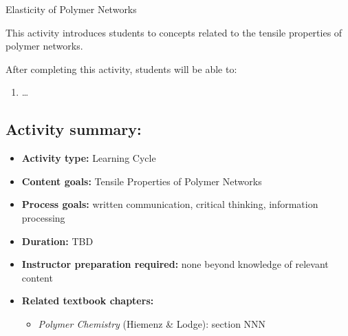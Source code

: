 %
%
%
%

\renewcommand{\figpath}{content/polymphys/mechanical-properties/elasticity/figs}
\renewcommand{\labelbase}{elasticity}

\begin{activity}{Elasticity of Polymer Networks}

\begin{instructornotes}
	This activity introduces students to concepts related to the tensile properties of polymer networks.
	
	After completing this activity, students will be able to:
	\begin{enumerate}
		\item \dots
	\end{enumerate}
	
	\subsection*{Activity summary:}
	\begin{itemize}
		\item \textbf{Activity type:} Learning Cycle
		\item \textbf{Content goals:} Tensile Properties of Polymer Networks
		\item \textbf{Process goals:} %
			written communication, critical thinking, information processing
		\item \textbf{Duration:} TBD
		\item \textbf{Instructor preparation required:} none beyond knowledge of relevant content
		\item \textbf{Related textbook chapters:}
			\begin{itemize}
				\item \emph{Polymer Chemistry} (Hiemenz \& Lodge): section NNN
			\end{itemize}
	\end{itemize}
	

\end{instructornotes}
\end{activity}
